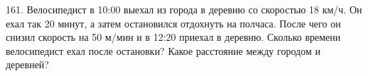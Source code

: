161. Велосипедист в 10:00 выехал из города в деревню со скоростью 18 км/ч. Он ехал так 20 минут, а затем остановился отдохнуть на полчаса. После чего он снизил скорость на 50 м/мин и в 12:20 приехал в деревню. Сколько времени велосипедист ехал после остановки? Какое расстояние между городом и деревней?\\
